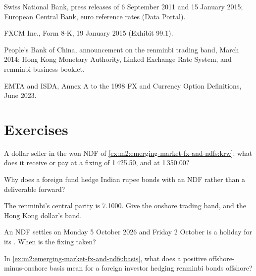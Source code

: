 \begin{omsources}
\item Swiss National Bank, press releases of 6 September 2011 and 15 January 2015;
European Central Bank, euro reference rates (Data Portal).
\item FXCM Inc., Form 8-K, 19 January 2015 (Exhibit 99.1).
\item People's Bank of China, announcement on the renminbi trading band, March
2014; Hong Kong Monetary Authority, Linked Exchange Rate System, and renminbi
business booklet.
\item EMTA and ISDA, Annex A to the 1998 FX and Currency Option Definitions, June
2023.
\end{omsources}

\section{Exercises}

\begin{exercise}[$\star$]\label{exo:m2:emerging-market-fx-and-ndfs:1}
A dollar seller in the won NDF of \cref{ex:m2:emerging-market-fx-and-ndfs:krw}:
what does it receive or pay at a fixing of 1\,425.50, and at 1\,350.00?
\end{exercise}

\begin{exercise}[$\star$]\label{exo:m2:emerging-market-fx-and-ndfs:2}
Why does a foreign fund hedge Indian rupee bonds with an NDF rather than a
deliverable forward?
\end{exercise}

\begin{exercise}[$\star$]\label{exo:m2:emerging-market-fx-and-ndfs:3}
The renminbi's central parity is 7.1000. Give the onshore trading band, and the
Hong Kong dollar's band.
\end{exercise}

\begin{exercise}[$\star\star$]\label{exo:m2:emerging-market-fx-and-ndfs:4}
An NDF settles on Monday 5 October 2026 and Friday 2 October is a holiday for its
. When is the fixing taken?
\end{exercise}

\begin{exercise}[$\star\star$]\label{exo:m2:emerging-market-fx-and-ndfs:5}
In \cref{ex:m2:emerging-market-fx-and-ndfs:basis}, what does a positive
offshore-minus-onshore basis mean for a foreign investor hedging renminbi
bonds offshore?
\end{exercise}

